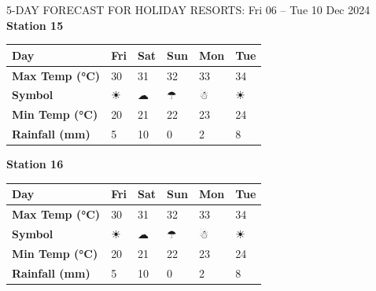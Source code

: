 \begin{frame}{5-DAY FORECAST FOR HOLIDAY RESORTS: Fri 06 – Tue 10 Dec 2024}
        \textbf{Station 15} \\
        \renewcommand{\arraystretch}{1.2} %
        \begin{tabular}{|p{2cm}|p{1.8cm}|p{1.8cm}|p{1.8cm}|p{1.8cm}|p{1.8cm}|}
        \hline
        \textbf{Day} & Fri & Sat & Sun & Mon & Tue \\ \hline
\textbf{Max Temp (°C)} & 30 & 31 & 32 & 33 & 34 \\ \hline
\textbf{Symbol} & ☀ & ☁ & ☂ & ☃ & ☀ \\ \hline
\textbf{Min Temp (°C)} & 20 & 21 & 22 & 23 & 24 \\ \hline
\textbf{Rainfall (mm)} & 5 & 10 & 0 & 2 & 8 \\ \hline
        \end{tabular}
        \vspace{0.5cm} %
        
        \textbf{Station 16} \\
        \renewcommand{\arraystretch}{1.2} %
        \begin{tabular}{|p{2cm}|p{1.8cm}|p{1.8cm}|p{1.8cm}|p{1.8cm}|p{1.8cm}|}
        \hline
        \textbf{Day} & Fri & Sat & Sun & Mon & Tue \\ \hline
\textbf{Max Temp (°C)} & 30 & 31 & 32 & 33 & 34 \\ \hline
\textbf{Symbol} & ☀ & ☁ & ☂ & ☃ & ☀ \\ \hline
\textbf{Min Temp (°C)} & 20 & 21 & 22 & 23 & 24 \\ \hline
\textbf{Rainfall (mm)} & 5 & 10 & 0 & 2 & 8 \\ \hline
        \end{tabular}
        \vspace{0.5cm} %
        \end{frame}
